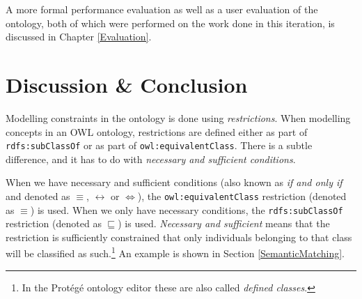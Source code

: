 A more formal performance evaluation as well as a user evaluation of the ontology, both of which were performed on the work done in this iteration, is discussed in Chapter \ref{Evaluation}.

		
		
\section{Discussion \& Conclusion}
\label{D2Discussion}

Modelling constraints in the ontology is done using \emph{restrictions}.  When modelling concepts in an \ac{OWL} ontology, restrictions are defined either as part of \texttt{rdfs:subClassOf} or as part of \texttt{owl:e\-quiv\-a\-lent\-Class}. There is a subtle difference, and it has to do with \emph{necessary and sufficient conditions}.

When we have necessary and sufficient conditions (also known as \emph{if and only if} and denoted as $ \equiv $, $ \leftrightarrow $ or $ \Leftrightarrow $), the \texttt{owl:e\-quiv\-a\-lent\-Class} restriction (denoted as $ \equiv $) is used. When we only have necessary conditions, the \texttt{rdfs:subClassOf} restriction (denoted as $ \sqsubseteq $) is used. \emph{Necessary and sufficient} means that the restriction is sufficiently constrained that only individuals belonging to that class will be classified as such.\footnote{In the Prot\'eg\'e ontology editor these are also called \emph{defined classes}.} An example is shown in Section \ref{SemanticMatching}. 



